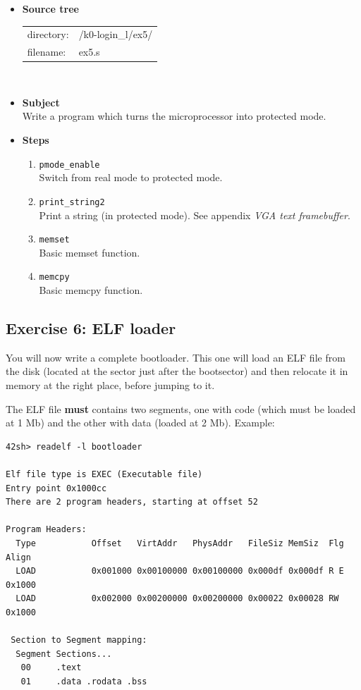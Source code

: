 \begin{itemize}
\item {\bf Source tree}\\
\begin{tabular}{p{4cm}l}
directory: & /k0-login\_l/ex5/\\
filename: & ex5.s
\end{tabular}
\\
\item {\bf Subject}\\
Write a program which turns the microprocessor into protected mode.\\
\item {\bf Steps}
  \begin{enumerate}
  \item {\tt pmode\_enable}\\
  Switch from real mode to protected mode.
  \item {\tt print\_string2}\\
  Print a string (in protected mode). See appendix \emph{VGA text
  framebuffer}.
  \item {\tt memset}\\
  Basic memset function.
  \item {\tt memcpy}\\
  Basic memcpy function.
  \end{enumerate}
\end{itemize}

\newpage

\subsection*{Exercise 6: ELF loader}

You will now write a complete bootloader. This one will load an ELF
file from the disk (located at the sector just after the bootsector)
and then relocate it in memory at the right place, before jumping to
it.

The ELF file \textbf{must} contains two segments, one with code (which
must be loaded at 1 Mb) and the other with data (loaded at 2
Mb). Example:

\begin{verbatim}
42sh> readelf -l bootloader

Elf file type is EXEC (Executable file)
Entry point 0x1000cc
There are 2 program headers, starting at offset 52

Program Headers:
  Type           Offset   VirtAddr   PhysAddr   FileSiz MemSiz  Flg Align
  LOAD           0x001000 0x00100000 0x00100000 0x000df 0x000df R E 0x1000
  LOAD           0x002000 0x00200000 0x00200000 0x00022 0x00028 RW  0x1000

 Section to Segment mapping:
  Segment Sections...
   00     .text
   01     .data .rodata .bss
\end{verbatim}


